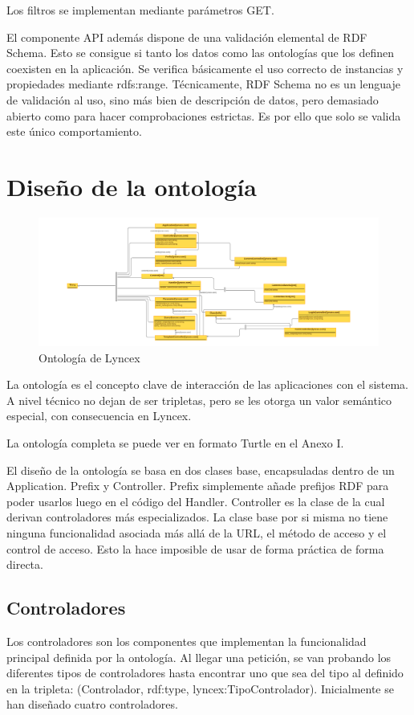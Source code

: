 \documentclass[12pt]{report} %
\begin{document}
Los filtros se implementan mediante parámetros GET.

El componente API además dispone de una validación elemental de RDF Schema.
Esto se consigue si tanto los datos como las ontologías que los definen coexisten en la aplicación.
Se verifica básicamente el uso correcto de instancias y propiedades mediante rdfs:range.
Técnicamente, RDF Schema no es un lenguaje de validación al uso, sino más bien de descripción de datos, pero demasiado abierto como para hacer comprobaciones estrictas.
Es por ello que solo se valida este único comportamiento.

\section{Diseño de la ontología}

\begin{figure}
    \centering
    \includegraphics[width=\textwidth]{lyncex.png}
    \caption{Ontología de Lyncex}
    \label{fig:ontologia}
\end{figure}

La ontología es el concepto clave de interacción de las aplicaciones con el sistema. A nivel técnico no dejan de ser tripletas, pero se les otorga un valor semántico especial, con consecuencia en Lyncex.

La ontología completa se puede ver en formato Turtle en el Anexo I.

El diseño de la ontología se basa en dos clases base, encapsuladas dentro de un Application. Prefix y Controller. Prefix simplemente añade prefijos RDF para poder usarlos luego en el código del Handler. Controller es la clase de la cual derivan controladores más especializados. La clase base por si misma no tiene ninguna funcionalidad asociada más allá de la URL, el método de acceso y el control de acceso. Esto la hace imposible de usar de forma práctica de forma directa.

\subsection{Controladores}
Los controladores son los componentes que implementan la funcionalidad principal definida por la ontología.
Al llegar una petición, se van probando los diferentes tipos de controladores hasta encontrar uno que sea del tipo al definido en la tripleta: (Controlador, rdf:type, lyncex:TipoControlador).
Inicialmente se han diseñado cuatro controladores.
\end{document}
